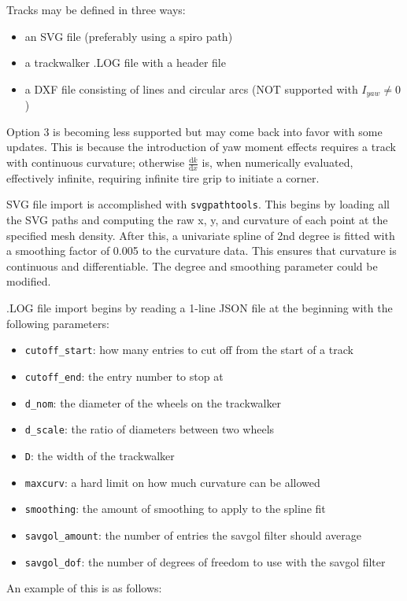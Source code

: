 \documentclass{article}
\def\D{\mathrm{d}}
\begin{document}
Tracks may be defined in three ways:
\begin{itemize}
\item an SVG file (preferably using a spiro path)
\item a trackwalker .LOG file with a header file
\item a DXF file consisting of lines and circular arcs (NOT supported with $I_{yaw} \neq 0$)
\end{itemize}

Option 3 is becoming less supported but may come back into favor with some updates. This is because the introduction of yaw moment effects requires a track with continuous curvature; otherwise $\frac{\D k}{\D x}$ is, when numerically evaluated, effectively infinite, requiring infinite tire grip to initiate a corner.

SVG file import is accomplished with \texttt{svgpathtools}. This begins by loading all the SVG paths and computing the raw x, y, and curvature of each point at the specified mesh density. After this, a univariate spline of 2nd degree is fitted with a smoothing factor of 0.005 to the curvature data. This ensures that curvature is continuous and differentiable. The degree and smoothing parameter could be modified.

.LOG file import begins by reading a 1-line JSON file at the beginning with the following parameters:
\begin{itemize}
\item \texttt{cutoff\_start}: how many entries to cut off from the start of a track
\item \texttt{cutoff\_end}: the entry number to stop at
\item \texttt{d\_nom}: the diameter of the wheels on the trackwalker
\item \texttt{d\_scale}: the ratio of diameters between two wheels
\item \texttt{D}: the width of the trackwalker
\item \texttt{maxcurv}: a hard limit on how much curvature can be allowed
\item \texttt{smoothing}: the amount of smoothing to apply to the spline fit
\item \texttt{savgol\_amount}: the number of entries the savgol filter should average
\item \texttt{savgol\_dof}: the number of degrees of freedom to use with the savgol filter
\end{itemize}

An example of this is as follows:
\end{document}
